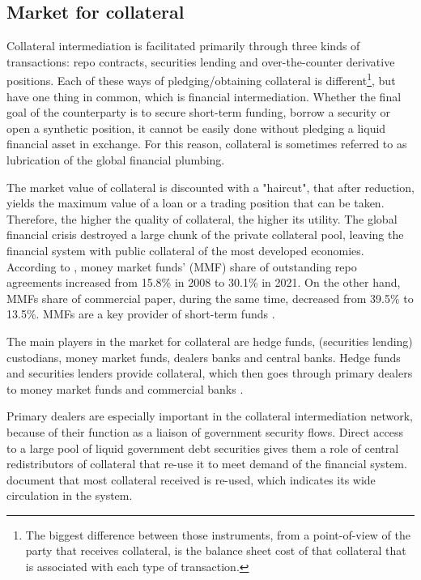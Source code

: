 \documentclass[11pt,a4paper,english,oneside]{article}
\begin{document}
\subsection{Market for collateral}

Collateral intermediation is facilitated primarily through three kinds of transactions: repo contracts, securities lending and over-the-counter derivative positions. Each of these ways of pledging/obtaining collateral is different\footnote{The biggest difference between those instruments, from a point-of-view of the party that receives collateral, is the balance sheet cost of that collateral that is associated with each type of transaction.}, but have one thing in common, which is financial intermediation. Whether the final goal of the counterparty is to secure short-term funding, borrow a security or open a synthetic position, it cannot be easily done without pledging a liquid financial asset in exchange. For this reason, collateral is sometimes referred to as lubrication of the global financial plumbing.

The market value of collateral is discounted with a "haircut", that after reduction, yields the maximum value of a loan or a trading position that can be taken. Therefore, the higher the quality of collateral, the higher its utility. The global financial crisis destroyed a large chunk of the private collateral pool, leaving the financial system with public collateral of the most developed economies. According to \citet{ofr2021b}, money market funds' (MMF) share of outstanding repo agreements increased from 15.8\% in 2008 to 30.1\% in 2021. On the other hand, MMFs share of commercial paper, during the same time, decreased from 39.5\% to 13.5\%. MMFs are a key provider of short-term funds \citep{ofr2021}.

The main players in the market for collateral are hedge funds, (securities lending) custodians, money market funds, dealers banks and central banks. Hedge funds and securities lenders provide collateral, which then goes through primary dealers to money market funds and commercial banks \citep{singh2017}.

Primary dealers are especially important in the collateral intermediation network, because of their function as a liaison of government security flows. Direct access to a large pool of liquid government debt securities gives them a role of central redistributors of collateral that re-use it to meet demand of the financial system. \citet{infante2020} document that most collateral received is re-used, which indicates its wide circulation in the system.
\end{document}
